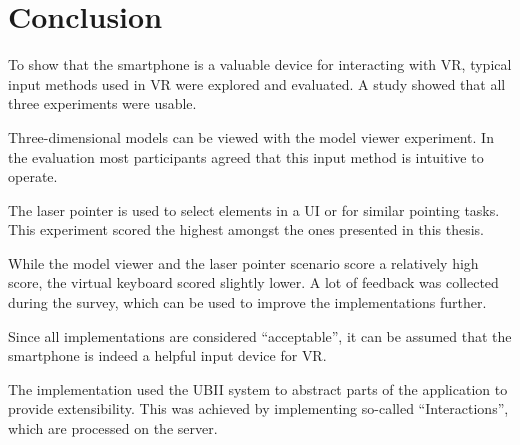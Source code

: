 \chapter{Conclusion}\label{chapter:conclusion}

To show that the smartphone is a valuable device for interacting with \gls{VR}, typical input methods used in \gls{VR} were explored and evaluated. A  study showed that all three experiments were usable. 

Three-dimensional models can be viewed with the model viewer experiment. In the evaluation most participants agreed that this input method is intuitive to operate.

The laser pointer is used to select elements in a \gls{UI} or for similar pointing tasks. This experiment scored the highest amongst the ones presented in this thesis. 

While the model viewer and the laser pointer scenario score a relatively high score, the virtual keyboard scored slightly lower. A lot of feedback was collected during the survey, which can be used to improve the implementations further.

Since all implementations are considered \enquote{acceptable}, it can be assumed that the smartphone is indeed a helpful input device for \gls{VR}.

The implementation used the \gls{UBII} system to abstract parts of the application to provide extensibility. This was achieved by implementing so-called \enquote{Interactions}, which are processed on the server. 

